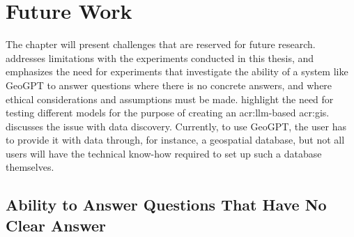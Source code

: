 \chapter{Future Work}
\label{cha:future-work}

\begin{comment}
Consider where you would like to extend or improve this work, or how somebody else could continue it.
These extensions might either be continuing the ongoing direction or taking a side direction that became obvious during the work.
Further, possible solutions to limitations in the work conducted, highlighted in Section~\ref{sec:discussion} may be presented.

Note that in the Specialisation Project Report, the Future Work section will be a key part of your plan for the novel work to be carried out in the next semester,
while in the Master's Thesis, the Future Work section rather will point to issues that others might be interested in addressing.
This can include options and alternatives that you did not try out yourself, or potential improvements and extensions to your experiments or system.
\end{comment}

The  chapter will present challenges that are reserved for future research.  addresses limitations with the experiments conducted in this thesis, and emphasizes the need for experiments that investigate the ability of a system like GeoGPT to answer questions where there is no concrete answers, and where ethical considerations and assumptions must be made.  highlight the need for testing different models for the purpose of creating an \acrshort{acr:llm}-based \acrshort{acr:gis}.  discusses the issue with data discovery. Currently, to use GeoGPT, the user has to provide it with data through, for instance, a geospatial database, but not all users will have the technical know-how required to set up such a database themselves.

\section{Ability to Answer Questions That Have No Clear Answer}
\label{sec:no-clear-answer}

